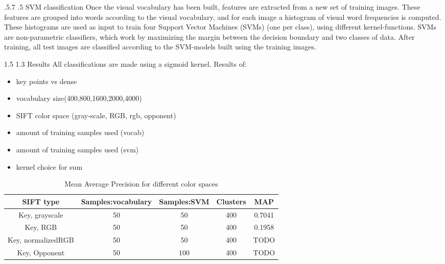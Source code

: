 \documentclass[12pt,a4paper]{amsart}
\makeatletter
\def\section{%
  \@startsection{section}{1}{\z@}%
  {1.5\linespacing\@plus\linespacing}%
  {1.3\linespacing}%
  {\bfseries\normalfont\scshape}
}
\def\subsection{\@startsection{subsection}{2}{\z@}%
  {.5\linespacing\@plus.7\linespacing}%
  {.5\linespacing}%
  {\small\normalfont}}
\makeatother
\begin{document}
\subsection{SVM classification}
Once the visual vocabulary has been built, features are extracted from a new set of training images. These features are grouped into words according to the visual vocabulary, and for each image a histogram of visual word frequencies is computed.
These histograms are used as input to train four Support Vector Machines (SVMs) (one per class), using different kernel-functions. SVMs are non-parametric classifiers, which work by maximizing the margin between the decision boundary and two classes of data.
After training, all test images are classified according to the SVM-models built using the training images. 

\section{Results}
All classifications are made using a sigmoid kernel.
Results of:\\
\begin{itemize}
\item key points vs dense
\item vocabulary size(400,800,1600,2000,4000)
\item SIFT color space (gray-scale, RGB, rgb, opponent)
\item amount of training samples used (vocab)
\item amount of training samples used (svm)
\item kernel choice for sum
\end{itemize}
\begin{table}[h!]
\centering
\begin{tabular}{ccccc}
SIFT type & Samples:vocabulary & Samples:SVM & Clusters & MAP\\
\toprule
Key, grayscale & 50 & 50 & 400 & 0.7041   \\
Key, RGB & 50 & 50 & 400 & 0.1958 \\
Key, normalizedRGB & 50 & 50 & 400 & TODO\\
Key, Opponent & 50 & 100 & 400 & TODO\\
\end{tabular}
\caption{Mean Average Precision for different color spaces}
\label{tbl:refOfTable}
\end{table}
\end{document}
